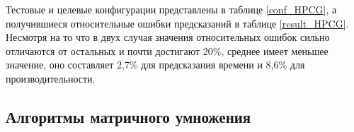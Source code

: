 		Тестовые и целевые конфигурации представлены в таблице \eqref{conf_HPCG}, а получившиеся относительные ошибки предсказаний в таблице \eqref{result_HPCG}. Несмотря на то что в двух случая значения относительных ошибок сильно отличаются от остальных и почти достигают 20\%, среднее имеет меньшее значение, оно составляет 2,7\% для предсказания времени и 8,6\% для производительности.

	\subsection{Алгоритмы матричного умножения}
